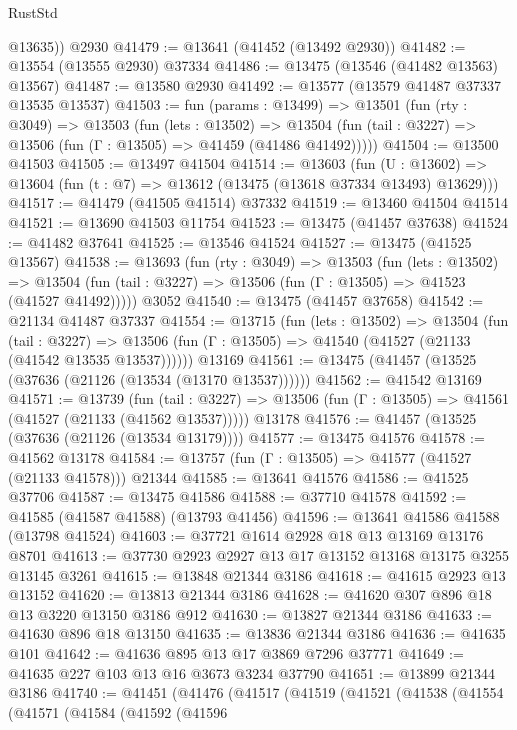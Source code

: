 \begin{lexlean}{RustStd}
\begin{coremodule}
        @13635))
    @2930
@41479 := @13641 (@41452 (@13492 @2930))
@41482 := @13554 (@13555 @2930) @37334
@41486 := @13475 (@13546 (@41482 @13563) @13567)
@41487 := @13580 @2930
@41492 := @13577 (@13579 @41487 @37337 @13535 @13537)
@41503 := fun (params : @13499) =>
  @13501
    (fun (rty : @3049) =>
    @13503
      (fun (lets : @13502) =>
      @13504 (fun (tail : @3227) => @13506 (fun (Γ : @13505) => @41459 (@41486 @41492)))))
@41504 := @13500 @41503
@41505 := @13497 @41504
@41514 := @13603
    (fun (U : @13602) => @13604 (fun (t : @7) => @13612 (@13475 (@13618 @37334 @13493) @13629)))
@41517 := @41479 (@41505 @41514) @37332
@41519 := @13460 @41504 @41514
@41521 := @13690 @41503 @11754
@41523 := @13475 (@41457 @37638)
@41524 := @41482 @37641
@41525 := @13546 @41524
@41527 := @13475 (@41525 @13567)
@41538 := @13693
    (fun (rty : @3049) =>
    @13503
      (fun (lets : @13502) =>
      @13504 (fun (tail : @3227) => @13506 (fun (Γ : @13505) => @41523 (@41527 @41492)))))
    @3052
@41540 := @13475 (@41457 @37658)
@41542 := @21134 @41487 @37337
@41554 := @13715
    (fun (lets : @13502) =>
    @13504
      (fun (tail : @3227) =>
      @13506 (fun (Γ : @13505) => @41540 (@41527 (@21133 (@41542 @13535 @13537))))))
    @13169
@41561 := @13475 (@41457 (@13525 (@37636 (@21126 (@13534 (@13170 @13537))))))
@41562 := @41542 @13169
@41571 := @13739
    (fun (tail : @3227) => @13506 (fun (Γ : @13505) => @41561 (@41527 (@21133 (@41562 @13537)))))
    @13178
@41576 := @41457 (@13525 (@37636 (@21126 (@13534 @13179))))
@41577 := @13475 @41576
@41578 := @41562 @13178
@41584 := @13757 (fun (Γ : @13505) => @41577 (@41527 (@21133 @41578))) @21344
@41585 := @13641 @41576
@41586 := @41525 @37706
@41587 := @13475 @41586
@41588 := @37710 @41578
@41592 := @41585 (@41587 @41588) (@13793 @41456)
@41596 := @13641 @41586 @41588 (@13798 @41524)
@41603 := @37721 @1614 @2928 @18 @13 @13169 @13176 @8701
@41613 := @37730 @2923 @2927 @13 @17 @13152 @13168 @13175 @3255 @13145 @3261
@41615 := @13848 @21344 @3186
@41618 := @41615 @2923 @13 @13152
@41620 := @13813 @21344 @3186
@41628 := @41620 @307 @896 @18 @13 @3220 @13150 @3186 @912
@41630 := @13827 @21344 @3186
@41633 := @41630 @896 @18 @13150
@41635 := @13836 @21344 @3186
@41636 := @41635 @101
@41642 := @41636 @895 @13 @17 @3869 @7296 @37771
@41649 := @41635 @227 @103 @13 @16 @3673 @3234 @37790
@41651 := @13899 @21344 @3186
@41740 := @41451
    (@41476
      (@41517
        (@41519
          (@41521
            (@41538
              (@41554
                (@41571
                  (@41584
                    (@41592
                      (@41596

\end{coremodule}
\end{lexlean}
